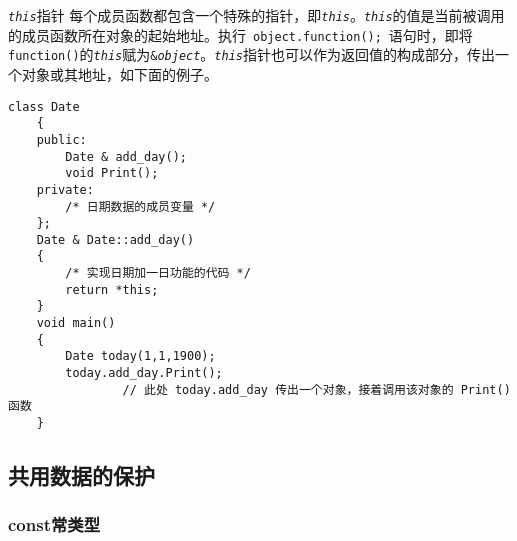 \documentclass[10pt, a4paper, oneside, fontset=none]{ctexart}
\theoremstyle{plain}
\theoremstyle{definition}
\newcommand{\colors}[1]{\color{#1!75!black}}
\newcommand{\zhu}[2][]{\begin{note}{#1}\xiu #2\end{note}}
\begin{document}
\zhu[\texttt{\textit{this}}指针]{
	每个成员函数都包含一个特殊的指针，即\texttt{\textit{this}}。\texttt{\textit{this}}的值是当前被调用的成员函数所在对象的起始地址。执行~\lstinline[moreemph={Strings}, emphstyle=\colors{qinglv}, moreemph={[2]{object}}, emphstyle={[2]\it\ttfamily}, ]|object.function();|~语句时，即将\texttt{function()}的\texttt{\textit{this}}赋为\texttt{\&\textit{object}}。\texttt{\textit{this}}指针也可以作为返回值的构成部分，传出一个对象或其地址，如下面的例子。
	\vspace{15.2\baselineskip}
}
\vspace{-16.2\baselineskip}
\begin{lstlisting}[style=notec, moreemph={Date}, emphstyle=\colors{qinglv}, moreemph={[2]{this, today}}, emphstyle={[2]\it\ttfamily}, ]
	class Date
	{
	public:
		Date & add_day();
		void Print();
	private:
		/* 日期数据的成员变量 */
	};
	Date & Date::add_day()
	{
		/* 实现日期加一日功能的代码 */
		return *this;
	}
	void main()
	{
		Date today(1,1,1900);
		today.add_day.Print();
				// 此处 today.add_day 传出一个对象，接着调用该对象的 Print() 函数
	}
\end{lstlisting}
\vspace{\baselineskip}

\newpage
\subsection{共用数据的保护}

\subsubsection{const常类型}
\end{document}
